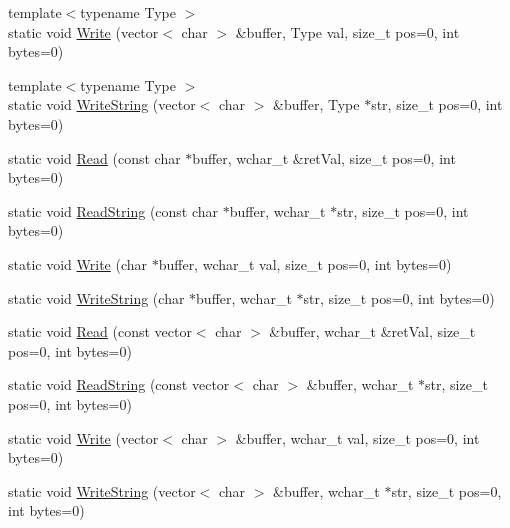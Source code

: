 \begin{DoxyCompactItemize}
\item 
{\footnotesize template$<$typename Type $>$ }\\static void \hyperlink{struct_y_compound_files_1_1_little_endian_a634ee9ee9122d1c2765f5e7edec3e316}{Write} (vector$<$ char $>$ \&buffer, Type val, size\+\_\+t pos=0, int bytes=0)
\item 
{\footnotesize template$<$typename Type $>$ }\\static void \hyperlink{struct_y_compound_files_1_1_little_endian_aa36071426512c3c8b9f915a3c464765c}{Write\+String} (vector$<$ char $>$ \&buffer, Type $\ast$str, size\+\_\+t pos=0, int bytes=0)
\item 
static void \hyperlink{struct_y_compound_files_1_1_little_endian_af8bb36347209e695f2583287fd90bd1d}{Read} (const char $\ast$buffer, wchar\+\_\+t \&ret\+Val, size\+\_\+t pos=0, int bytes=0)
\item 
static void \hyperlink{struct_y_compound_files_1_1_little_endian_a0d5fa769f24deb1c0d64b0d2166380b4}{Read\+String} (const char $\ast$buffer, wchar\+\_\+t $\ast$str, size\+\_\+t pos=0, int bytes=0)
\item 
static void \hyperlink{struct_y_compound_files_1_1_little_endian_a5ef0063196ca0fb704011bf7dda670cd}{Write} (char $\ast$buffer, wchar\+\_\+t val, size\+\_\+t pos=0, int bytes=0)
\item 
static void \hyperlink{struct_y_compound_files_1_1_little_endian_a8e1c4f95816e34b7b01acef853677354}{Write\+String} (char $\ast$buffer, wchar\+\_\+t $\ast$str, size\+\_\+t pos=0, int bytes=0)
\item 
static void \hyperlink{struct_y_compound_files_1_1_little_endian_a8a619b28efc8943270515b67c78c393d}{Read} (const vector$<$ char $>$ \&buffer, wchar\+\_\+t \&ret\+Val, size\+\_\+t pos=0, int bytes=0)
\item 
static void \hyperlink{struct_y_compound_files_1_1_little_endian_a7be32fbf63ebbf7eb40585c12e943571}{Read\+String} (const vector$<$ char $>$ \&buffer, wchar\+\_\+t $\ast$str, size\+\_\+t pos=0, int bytes=0)
\item 
static void \hyperlink{struct_y_compound_files_1_1_little_endian_af9c956dd7d659648601412f90eaa06a3}{Write} (vector$<$ char $>$ \&buffer, wchar\+\_\+t val, size\+\_\+t pos=0, int bytes=0)
\item 
static void \hyperlink{struct_y_compound_files_1_1_little_endian_a5d0a7504c887a43d1cf121b794e58645}{Write\+String} (vector$<$ char $>$ \&buffer, wchar\+\_\+t $\ast$str, size\+\_\+t pos=0, int bytes=0)
\item 

\end{DoxyCompactItemize}
